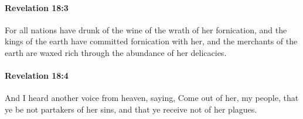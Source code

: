 		\paragraph{Revelation 18:3} %
			\label{REVELATIONNT-18-3}

			For all nations have drunk of the wine of the wrath of her fornication, and the kings of the earth have committed fornication with her, and the merchants of the earth are waxed rich through the abundance of her delicacies.

			\begin{framed}
			\scriptsize
				\begin{compactdesc}
					\item[SBLG] 
				\end{compactdesc}
			\end{framed}

		\paragraph{Revelation 18:4} %
			\label{REVELATIONNT-18-4}

			And I heard another voice from heaven, saying, Come out of her, my people, that ye be not partakers of her sins, and that ye receive not of her plagues.


